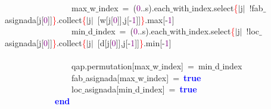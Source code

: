 \mbox{}\ \ \ \ \ \ \ \ \ \ \ \ \ \ \ \ max$\_$w$\_$index\ \textcolor{BrickRed}{=}\ \textcolor{BrickRed}{(}\textcolor{Purple}{0}\textcolor{BrickRed}{..}s\textcolor{BrickRed}{).}each$\_$with$\_$index\textcolor{BrickRed}{.}select\textcolor{Red}{\{}\textcolor{BrickRed}{$|$}j\textcolor{BrickRed}{$|$}\ \textcolor{BrickRed}{!}fab$\_$asignada\textcolor{BrickRed}{[}j\textcolor{BrickRed}{[}\textcolor{Purple}{0}\textcolor{BrickRed}{]]}\textcolor{Red}{\}}\textcolor{BrickRed}{.}collect\textcolor{Red}{\{}\textcolor{BrickRed}{$|$}j\textcolor{BrickRed}{$|$}\ \textcolor{BrickRed}{[}w\textcolor{BrickRed}{[}j\textcolor{BrickRed}{[}\textcolor{Purple}{0}\textcolor{BrickRed}{]],}j\textcolor{BrickRed}{[-}\textcolor{Purple}{1}\textcolor{BrickRed}{]]}\textcolor{Red}{\}}\textcolor{BrickRed}{.}max\textcolor{BrickRed}{[-}\textcolor{Purple}{1}\textcolor{BrickRed}{]} \\
\mbox{}\ \ \ \ \ \ \ \ \ \ \ \ \ \ \ \ min$\_$d$\_$index\ \textcolor{BrickRed}{=}\ \textcolor{BrickRed}{(}\textcolor{Purple}{0}\textcolor{BrickRed}{..}s\textcolor{BrickRed}{).}each$\_$with$\_$index\textcolor{BrickRed}{.}select\textcolor{Red}{\{}\textcolor{BrickRed}{$|$}j\textcolor{BrickRed}{$|$}\ \textcolor{BrickRed}{!}loc$\_$asignada\textcolor{BrickRed}{[}j\textcolor{BrickRed}{[}\textcolor{Purple}{0}\textcolor{BrickRed}{]]}\textcolor{Red}{\}}\textcolor{BrickRed}{.}collect\textcolor{Red}{\{}\textcolor{BrickRed}{$|$}j\textcolor{BrickRed}{$|$}\ \textcolor{BrickRed}{[}d\textcolor{BrickRed}{[}j\textcolor{BrickRed}{[}\textcolor{Purple}{0}\textcolor{BrickRed}{]],}j\textcolor{BrickRed}{[-}\textcolor{Purple}{1}\textcolor{BrickRed}{]]}\textcolor{Red}{\}}\textcolor{BrickRed}{.}min\textcolor{BrickRed}{[-}\textcolor{Purple}{1}\textcolor{BrickRed}{]} \\
\mbox{}\ \ \ \ \ \ \ \ \ \ \ \ \ \ \ \  \\
\mbox{}\ \ \ \ \ \ \ \ \ \ \ \ \ \ \ \ qap\textcolor{BrickRed}{.}permutation\textcolor{BrickRed}{[}max$\_$w$\_$index\textcolor{BrickRed}{]}\ \textcolor{BrickRed}{=}\ min$\_$d$\_$index \\
\mbox{}\ \ \ \ \ \ \ \ \ \ \ \ \ \ \ \ fab$\_$asignada\textcolor{BrickRed}{[}max$\_$w$\_$index\textcolor{BrickRed}{]}\ \textcolor{BrickRed}{=}\ \textbf{\textcolor{Blue}{true}} \\
\mbox{}\ \ \ \ \ \ \ \ \ \ \ \ \ \ \ \ loc$\_$asignada\textcolor{BrickRed}{[}min$\_$d$\_$index\textcolor{BrickRed}{]}\ \textcolor{BrickRed}{=}\ \textbf{\textcolor{Blue}{true}} \\
\mbox{}\ \ \ \ \ \ \ \ \ \ \ \ \textbf{\textcolor{Blue}{end}} \\
